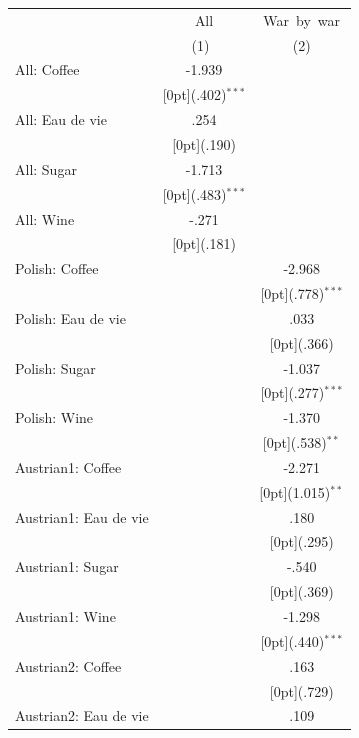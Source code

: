 \documentclass[12pt,a4paper,titlepage]{article}
\begin{document}
{
 \label{tab:title} 
\begin{tabular*}{\textwidth}{@{\extracolsep{\fill}}lcc}		
	& \multicolumn{1}{c}{All} &	\multicolumn{1}{c}{War~by~war} \\
\cline{2-3}		
	& \multicolumn{1}{c}{(1)\mbox{\ }} &	\multicolumn{1}{c}{(2)} \\
\hline		
All: Coffee &	-1.939 &	\\
&	\raisebox{.7ex}[0pt]{\scriptsize (.402)$^{***}$} &	\\
All: Eau de vie &	.254 &	\\
&	\raisebox{.7ex}[0pt]{\scriptsize (.190)} &	\\
All: Sugar &	-1.713 &	\\
&	\raisebox{.7ex}[0pt]{\scriptsize (.483)$^{***}$} &	\\
All: Wine &	-.271 &	\\
&	\raisebox{.7ex}[0pt]{\scriptsize (.181)} &	\\
Polish: Coffee &	&	-2.968 \\
&	&	\raisebox{.7ex}[0pt]{\scriptsize (.778)$^{***}$} \\
Polish: Eau de vie &	&	.033 \\
&	&	\raisebox{.7ex}[0pt]{\scriptsize (.366)} \\
Polish: Sugar &	&	-1.037 \\
&	&	\raisebox{.7ex}[0pt]{\scriptsize (.277)$^{***}$} \\
Polish: Wine &	&	-1.370 \\
&	&	\raisebox{.7ex}[0pt]{\scriptsize (.538)$^{**}$} \\
Austrian1: Coffee &	&	-2.271 \\
&	&	\raisebox{.7ex}[0pt]{\scriptsize (1.015)$^{**}$} \\
Austrian1: Eau de vie &	&	.180 \\
&	&	\raisebox{.7ex}[0pt]{\scriptsize (.295)} \\
Austrian1: Sugar &	&	-.540 \\
&	&	\raisebox{.7ex}[0pt]{\scriptsize (.369)} \\
Austrian1: Wine &	&	-1.298 \\
&	&	\raisebox{.7ex}[0pt]{\scriptsize (.440)$^{***}$} \\
Austrian2: Coffee &	&	.163 \\
&	&	\raisebox{.7ex}[0pt]{\scriptsize (.729)} \\
Austrian2: Eau de vie &	&	.109 \\

\end{tabular*}}
\end{document}
